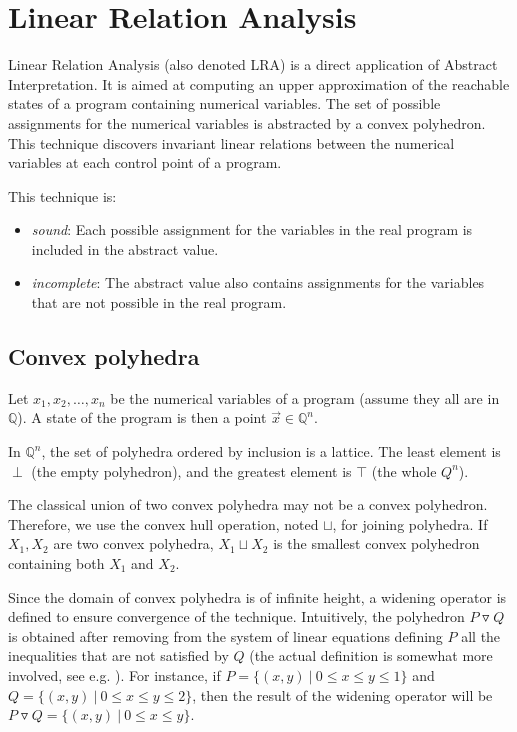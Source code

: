 \documentclass[a4paper,english,titlepage,11pt]{report}
\def\Q{\mathbb{Q}}
\newcommand{\widening}{\mathop{\triangledown}}
\begin{document}
\section{Linear Relation Analysis}

Linear Relation Analysis \cite{CH78} (also denoted LRA) is a direct application
of
Abstract Interpretation. It is aimed at computing an upper approximation of the
reachable states of a program containing numerical variables. The set of
possible assignments for the numerical variables is abstracted by a convex
polyhedron. This technique discovers invariant linear relations between
the numerical variables at each control point of a program.

This technique is:
\begin{itemize}
\item \emph{sound}: Each possible assignment for the variables in the real
program is included in the abstract value.
\item \emph{incomplete}: The abstract value also contains assignments for the
variables that are not possible in the real program.
\end{itemize}

\subsection{Convex polyhedra}

Let $x_1, x_2, \dots ,x_n$ be the numerical variables of a program (assume they
all are in $\Q$). A state of
the program is then a point $\overrightarrow{x} \in \Q^n$.

In $\Q^n$, the set of polyhedra ordered by inclusion is a lattice. The least element is $\perp$
(the empty polyhedron), and the greatest element is $\top$ (the whole $Q^n$).

The classical union of two convex polyhedra may not be a convex polyhedron.
Therefore, we use the convex hull operation, noted $\sqcup$, for joining
polyhedra. 
If $X_1, X_2$ are two convex polyhedra, $X_1 \sqcup X_2$ is the
smallest convex polyhedron containing both $X_1$ and $X_2$.

Since the domain of convex polyhedra is of infinite height, a widening operator
is defined to ensure convergence of the technique. 
Intuitively, the polyhedron $P \widening Q$ is obtained after 
removing from the system of linear equations defining $P$ all the inequalities
that are not satisfied by $Q$ (the actual definition is somewhat more involved,
see e.g. \cite{BagnaraHRZ05SCP}).
For instance, if $P = \{(x,y)\ |\ 0 \leq x \leq y \leq 1 \}$ and $Q = 
\{(x,y)\ |\ 0 \leq x \leq y \leq 2 \}$, then the result of the widening operator
will be $P \widening Q = \{(x,y)\ |\ 0 \leq x \leq y \}$.
\end{document}

